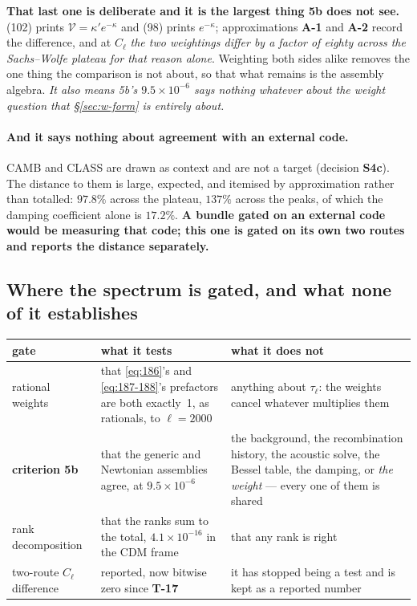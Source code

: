 \textbf{That last one is deliberate and it is the largest thing 5b does not
see.} (102) prints $\mathcal V=\kappa'e^{-\kappa}$ and (98) prints
$e^{-\kappa}$; approximations \textbf{A-1} and \textbf{A-2} record the
difference, and at $C_\ell$ \emph{the two weightings differ by a factor of
eighty across the Sachs--Wolfe plateau for that reason alone}. Weighting both
sides alike removes the one thing the comparison is not about, so that what
remains is the assembly algebra. \emph{It also means 5b's
$9.5\times10^{-6}$ says nothing whatever about the weight question that
\S\ref{sec:w-form} is entirely about.}

\paragraph{And it says nothing about agreement with an external code.} CAMB and
CLASS are drawn as context and are not a target (decision \textbf{S4c}). The
distance to them is large, expected, and itemised by approximation rather than
totalled: $97.8\%$ across the plateau, $137\%$ across the peaks, of which the
damping coefficient alone is $17.2\%$. \textbf{A bundle gated on an external
code would be measuring that code; this one is gated on its own two routes and
reports the distance separately.}

\subsection{Where the spectrum is gated, and what none of it establishes}

\begin{center}\small
\begin{tabularx}{\textwidth}{@{}l >{\raggedright\arraybackslash}X >{\raggedright\arraybackslash}X@{}}
\toprule
\textbf{gate} & \textbf{what it tests} & \textbf{what it does not} \\
\midrule
rational weights & that \eqref{eq:186}'s and \eqref{eq:187-188}'s prefactors are
  both exactly~1, as rationals, to $\ell=2000$ &
  anything about $\tau_\ell$: the weights cancel whatever multiplies them \\
\textbf{criterion 5b} & that the generic and Newtonian assemblies agree, at
  $9.5\times10^{-6}$ & the background, the recombination history, the acoustic
  solve, the Bessel table, the damping, or \emph{the weight} --- every one of
  them is shared \\
rank decomposition & that the ranks sum to the total, $4.1\times10^{-16}$ in
  the CDM frame & that any rank is right \\
two-route $C_\ell$ difference & reported, now bitwise zero since \textbf{T-17}
  & it has stopped being a test and is kept as a reported number \\
\bottomrule
\end{tabularx}
\end{center}

